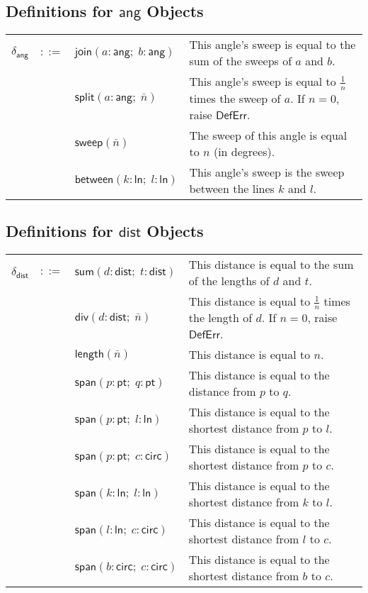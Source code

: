 \documentclass[11pt]{report}
\begin{document}
\subsection{Definitions for $\mathsf{ang}$ Objects}
\label{subsec:def-ang}

\begin{tabularx}{\textwidth}{l l l X}
$\delta_{\mathsf{ang}}$ & $::=$ & $\mathsf{join}(a : \mathsf{ang}; \; b : \mathsf{ang})$ & This angle's sweep is equal to the sum of the sweeps of $a$ and $b$. \\
 & & $\mathsf{split}(a : \mathsf{ang}; \; \bar{n})$ & This angle's sweep is equal to $\frac{1}{n}$ times the sweep of $a$. If $n = 0$, raise $\mathsf{DefErr}$. \\
 & & $\mathsf{sweep}(\bar{n})$ & The sweep of this angle is equal to $n$ (in degrees). \\
 & & $\mathsf{between}(k : \mathsf{ln}; \; l : \mathsf{ln})$ & This angle's sweep is the sweep between the lines $k$ and $l$. \\
\end{tabularx}

\subsection{Definitions for $\mathsf{dist}$ Objects}
\label{subsec:def-dist}

\begin{tabularx}{\textwidth}{l l l X}
$\delta_{\mathsf{dist}}$ & $::=$ & $\mathsf{sum}(d : \mathsf{dist}; \; t : \mathsf{dist})$ & This distance is equal to the sum of the lengths of $d$ and $t$. \\
 & & $\mathsf{div}(d : \mathsf{dist}; \; \bar{n})$ & This distance is equal to $\frac{1}{n}$ times the length of $d$. If $n = 0$, raise $\mathsf{DefErr}$. \\
 & & $\mathsf{length}(\bar{n})$ & This distance is equal to $n$.\\
 & & $\mathsf{span}(p : \mathsf{pt}; \; q : \mathsf{pt})$ & This distance is equal to the distance from $p$ to $q$. \\
 & & $\mathsf{span}(p : \mathsf{pt}; \; l : \mathsf{ln})$ & This distance is equal to the shortest distance from $p$ to $l$. \\
 & & $\mathsf{span}(p : \mathsf{pt}; \; c : \mathsf{circ})$ & This distance is equal to the shortest distance from $p$ to $c$. \\
 & & $\mathsf{span}(k : \mathsf{ln}; \; l : \mathsf{ln})$ & This distance is equal to the shortest distance from $k$ to $l$. \\
 & & $\mathsf{span}(l : \mathsf{ln}; \; c : \mathsf{circ})$ & This distance is equal to the shortest distance from $l$ to $c$. \\
 & & $\mathsf{span}(b : \mathsf{circ}; \; c : \mathsf{circ})$ & This distance is equal to the shortest distance from $b$ to $c$. \\

\end{tabularx}
\end{document}
